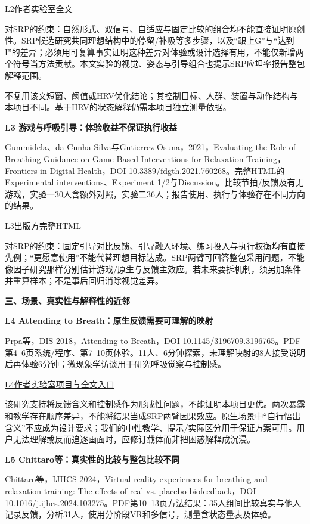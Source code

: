 \documentclass[11pt,a4paper]{article}
\newcommand{\reviewsection}[1]{\par\Needspace{9\baselineskip}\vspace{10pt}\begin{center}{\titlelatin\titlecjk\bfseries\fontsize{14}{20}\selectfont #1}\end{center}}
\newcommand{\reviewsubsection}[1]{\par\Needspace{4\baselineskip}\vspace{4pt}\begin{center}{\titlelatin\titlecjk\bfseries\fontsize{12}{18}\selectfont #1}\end{center}}
\begin{document}
\href{https://pi.cs.tsinghua.edu.cn/wp-content/uploads/2026/04/3772318.3790488.pdf}{L2作者实验室全文}


对SRP的约束：自然形式、双信号、自适应与固定比较的组合均不能直接证明原创性。SRP候选研究共同理想结构中的停留/\allowbreak{}补吸等多步骤，以及“跟上G”与“达到I”的差异；必须用可复算事实证明这种差异对体验或设计选择有用，不能仅新增两个符号当方法贡献。本文实验的视觉、姿态与引导组合也提示SRP应坦率报告整包解释范围。


不复用该文短窗、阈值或HRV优化结论；其控制目标、人群、装置与动作结构与本项目不同。基于HRV的状态解释仍需本项目独立测量依据。


\reviewsubsection{2.3 L3 游戏与呼吸引导：体验收益不保证执行收益}
Gummidela、da Cunha Silva与Gutierrez-\allowbreak{}Osuna，2021，Evaluating the Role of Breathing Guidance on Game-\allowbreak{}Based Interventions for Relaxation Training，Frontiers in Digital Health，DOI 10.3389/\allowbreak{}fdgth.2021.760268。完整HTML的Experimental interventions、Experiment 1/\allowbreak{}2与Discussion。比较节拍/\allowbreak{}反馈及有无游戏，实验一30人含额外对照，实验二36人；报告使用、执行与体验存在不同方向的结果。


\href{https://www.frontiersin.org/journals/digital-health/articles/10.3389/fdgth.2021.760268/full}{L3出版方完整HTML}


对SRP的约束：固定引导对比反馈、引导融入环境、练习投入与执行权衡均有直接先例；“更愿意使用”不能代替理想目标达成。SRP两臂可回答整包采用问题，不能像因子研究那样分别估计游戏/\allowbreak{}原生与反馈主效应。若未来要拆机制，须另加条件并重算样本；不是事后回归消除视觉差异。


\reviewsection{三、场景、真实性与解释性的近邻}
\reviewsubsection{3.1 L4 Attending to Breath：原生反馈需要可理解的映射}
Prpa等，DIS 2018，Attending to Breath，DOI 10.1145/\allowbreak{}3196709.3196765。PDF第4–6页系统/\allowbreak{}程序、第7–10页体验。11人、6分钟探索，未理解映射的8人接受说明后再体验6分钟；微现象学访谈用于研究呼吸觉察与控制感。


\href{https://www.metacreation.net/projects/respire}{L4作者实验室项目与全文入口}


该研究支持将反馈含义和控制感作为形成性问题，不能证明本项目更优。两次暴露和教学存在顺序差异，不能将结果当成SRP两臂因果效应。原生场景中“自行悟出含义”不应成为设计要求；我们的中性教学、提示/\allowbreak{}实际区分用于保证方案可用。用户无法理解或反而追逐画面时，应修订载体而非把困惑解释成沉浸。


\reviewsubsection{3.2 L5 Chittaro等：真实性的比较与整包比较不同}
Chittaro等，IJHCS 2024，Virtual reality experiences for breathing and relaxation training: The effects of real vs. placebo biofeedback，DOI 10.1016/\allowbreak{}j.ijhcs.2024.103275。PDF第10–13页方法结果：35人组间比较真实与他人记录反馈，分析31人，使用分阶段VR和多信号，测量含状态量表及体验。
\end{document}
